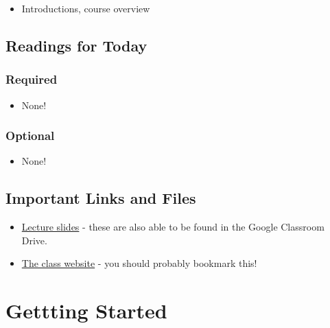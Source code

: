 \documentclass[
]{book}
\providecommand{\tightlist}{%
  \setlength{\itemsep}{0pt}\setlength{\parskip}{0pt}}
\begin{document}
\begin{itemize}
\tightlist
\item
  Introductions, course overview
\end{itemize}

\hypertarget{readings-for-today}{%
\section*{Readings for Today}\label{readings-for-today}}

\hypertarget{required}{%
\subsection*{Required}\label{required}}

\begin{itemize}
\tightlist
\item
  None!
\end{itemize}

\hypertarget{optional}{%
\subsection*{Optional}\label{optional}}

\begin{itemize}
\tightlist
\item
  None!
\end{itemize}

\hypertarget{important-links-and-files}{%
\section*{Important Links and Files}\label{important-links-and-files}}

\begin{itemize}
\tightlist
\item
  \href{https://docs.google.com/presentation/d/1z7WG_krmvSzPtW7LUoVnsbVJtHaxMtnCHQwXULWnbUM/edit\#slide=id.gee3ce8d919_0_390}{Lecture slides} - these are also able to be found in the Google Classroom Drive.
\item
  \href{https://ads-coa.netlify.app/}{The class website} - you should probably bookmark this!
\end{itemize}

\hypertarget{gettting-started}{%
\chapter{Gettting Started}\label{gettting-started}}
\end{document}
